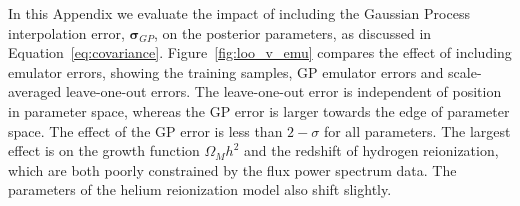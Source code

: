 In this Appendix we evaluate the impact of including the Gaussian Process interpolation error, $\boldsymbol{\sigma}_{GP}$, on the posterior parameters, as discussed in Equation~\ref{eq:covariance}. Figure~\ref{fig:loo_v_emu} compares the effect of including emulator errors, showing the training samples, GP emulator errors and scale-averaged leave-one-out errors. The leave-one-out error is independent of position in parameter space, whereas the GP error is larger towards the edge of parameter space. The effect of the GP error is less than $2-\sigma$ for all parameters. The largest effect is on the growth function $\Omega_M h^2$ and the redshift of hydrogen reionization, which are both poorly constrained by the flux power spectrum data.
The parameters of the helium reionization model also shift slightly. 







